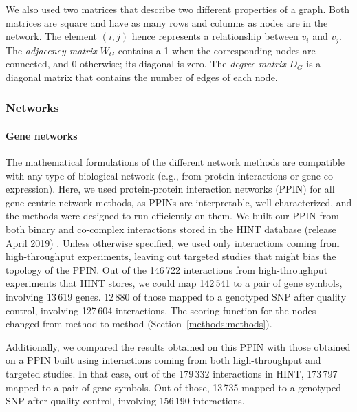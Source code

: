 \documentclass[10pt,letterpaper]{article}
\begin{document}
We also used two matrices that describe two different properties of a graph. Both matrices are square and have as many rows and columns as nodes are in the network. The element $(i,j)$ hence represents a relationship between $v_i$ and $v_j$. The \emph{adjacency matrix} $W_G$ contains a 1 when the corresponding nodes are connected, and 0 otherwise; its diagonal is zero. The \emph{degree matrix} $D_G$ is a diagonal matrix that contains the number of edges of each node.

\subsubsection{Networks}
\label{methods:networks}

\paragraph{Gene networks}
The mathematical formulations of the different network methods are compatible with any type of biological network (e.g., from protein interactions or gene co-expression). Here, we used protein-protein interaction networks (PPIN) for all gene-centric network methods, as PPINs are interpretable, well-characterized, and the methods were designed to run efficiently on them. We built our PPIN from both binary and co-complex interactions stored in the HINT database (release April 2019) \cite{das_hint:_2012}. Unless otherwise specified, we used only interactions coming from high-throughput experiments, leaving out targeted studies that might bias the topology of the PPIN. Out of the 146\,722 interactions from high-throughput experiments that HINT stores, we could map 142\,541 to a pair of gene symbols, involving 13\,619 genes. 12\,880 of those mapped to a genotyped SNP after quality control, involving 127\,604 interactions. The scoring function for the nodes changed from method to method (Section~\ref{methods:methods}).

Additionally, we compared the results obtained on this PPIN with those obtained on a PPIN built using interactions coming from both high-throughput and targeted studies. In that case, out of the 179\,332 interactions in HINT, 173\,797 mapped to a pair of gene symbols. Out of those, 13\,735 mapped to a genotyped SNP after quality control, involving 156\,190 interactions.
\end{document}
